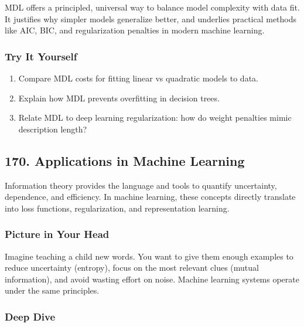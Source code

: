\documentclass[
  letterpaper,
  DIV=11,
  numbers=noendperiod]{scrreprt}
\providecommand{\tightlist}{%
  \setlength{\itemsep}{0pt}\setlength{\parskip}{0pt}}
\begin{document}
MDL offers a principled, universal way to balance model complexity with
data fit. It justifies why simpler models generalize better, and
underlies practical methods like AIC, BIC, and regularization penalties
in modern machine learning.

\subsubsection{Try It Yourself}\label{try-it-yourself-168}

\begin{enumerate}
\def\labelenumi{\arabic{enumi}.}
\tightlist
\item
  Compare MDL costs for fitting linear vs quadratic models to data.
\item
  Explain how MDL prevents overfitting in decision trees.
\item
  Relate MDL to deep learning regularization: how do weight penalties
  mimic description length?
\end{enumerate}

\subsection{170. Applications in Machine
Learning}\label{applications-in-machine-learning}

Information theory provides the language and tools to quantify
uncertainty, dependence, and efficiency. In machine learning, these
concepts directly translate into loss functions, regularization, and
representation learning.

\subsubsection{Picture in Your Head}\label{picture-in-your-head-169}

Imagine teaching a child new words. You want to give them enough
examples to reduce uncertainty (entropy), focus on the most relevant
clues (mutual information), and avoid wasting effort on noise. Machine
learning systems operate under the same principles.

\subsubsection{Deep Dive}\label{deep-dive-169}
\end{document}
